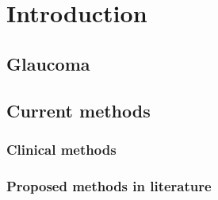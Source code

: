 \chapter{Introduction}

\section{Glaucoma}

\section{Current methods}

\subsection{Clinical methods}

\subsection{Proposed methods in literature}
